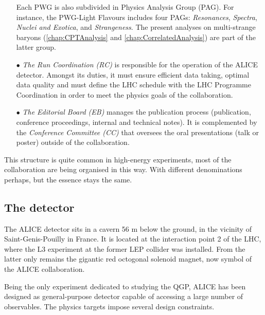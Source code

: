 \begin{itemize}
Each PWG is also subdivided in Physics Analysis Group (PAG). For instance, the PWG-Light Flavours includes four PAGs: \textit{Resonances}, \textit{Spectra}, \textit{Nuclei and Exotica}, and \textit{Strangeness}. The present analyses on multi-strange baryons (\chap\ref{chap:CPTAnalysis} and \ref{chap:CorrelatedAnalysis}) are part of the latter group.

\item[$\bullet$] \textit{The Run Coordination (RC)} is responsible for the operation of the ALICE detector. Amongst its duties, it must ensure efficient data taking, optimal data quality and must define the LHC schedule with the LHC Programme Coordination in order to meet the physics goals of the collaboration.
\item[$\bullet$] \textit{The Editorial Board (EB)} manages the publication process (publication, conference proceedings, internal and technical notes). It is complemented by the \textit{Conference Committee (CC)} that oversees the oral presentations (talk or poster) outside of the collaboration.
\end{itemize}

This structure is quite common in high-energy experiments, most of the collaboration are being organised in this way. With different denominations perhaps, but the essence stays the same.

\subsection{The detector}
\label{subsec:ALICEDetector}

The ALICE detector sits in a cavern 56 m below the ground, in the vicinity of Saint-Genis-Pouilly in France. It is located at the interaction point 2 of the LHC, where the L3 experiment at the former LEP collider was installed. From the latter only remains the gigantic red octogonal solenoid magnet, now symbol of the ALICE collaboration.

Being the only experiment dedicated to studying the QGP, ALICE has been designed as general-purpose detector capable of accessing a large number of observables. The physics targets impose several design constraints.

